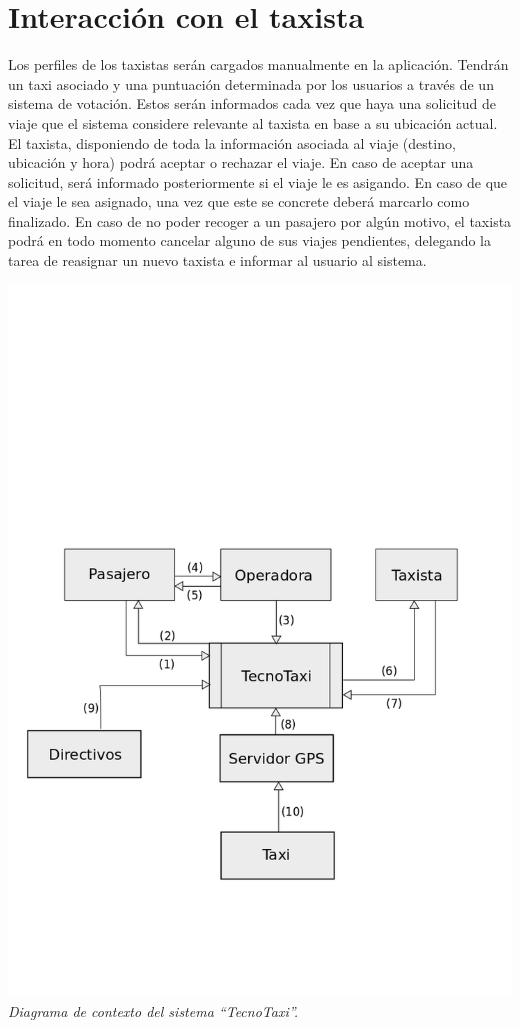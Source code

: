 \section{Interacción con el taxista}
Los perfiles de los taxistas serán cargados manualmente en la aplicación. Tendrán un taxi asociado y una puntuación determinada por los usuarios a través de un sistema de votación. Estos serán informados cada vez que haya una solicitud de viaje que el sistema considere relevante al taxista en base a su ubicación actual. El taxista, disponiendo de toda la información asociada al viaje (destino, ubicación y hora) podrá aceptar o rechazar el viaje. En caso de aceptar una solicitud, será informado posteriormente si el viaje le es asigando. En caso de que el viaje le sea asignado, una vez que este se concrete deberá marcarlo como finalizado. En caso de no poder recoger a un pasajero por algún motivo, el taxista podrá en todo momento cancelar alguno de sus viajes pendientes, delegando la tarea de reasignar un nuevo taxista e informar al usuario al sistema.

\vspace{\baselineskip}
        \begin{center}
		    \includegraphics[scale=0.50]{contexto.png}
		    \\
		    \vspace{1pt}
		    \footnotesize\textit{Diagrama de contexto del sistema “TecnoTaxi”.}
	    \end{center}
    \vspace{\baselineskip}
\par 

